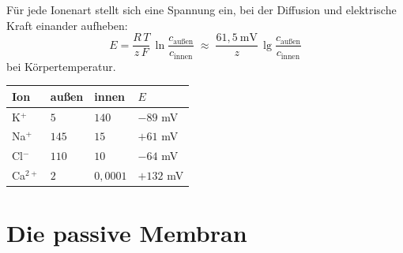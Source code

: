 \begin{merksatz}
Für jede Ionenart stellt sich eine Spannung ein, bei der Diffusion und elektrische Kraft einander aufheben:
\[ E = \frac{R\,T}{z\,F}\,\ln\frac{c_{\text{außen}}}{c_{\text{innen}}} \;\approx\; \frac{61{,}5\ \mathrm{mV}}{z}\,\lg\frac{c_{\text{außen}}}{c_{\text{innen}}} \]
bei Körpertemperatur.

\begin{center}
{\small
\renewcommand{\arraystretch}{1.45}
\begin{tabular}{@{}P{1.6cm}P{1.8cm}P{1.8cm}P{2.0cm}@{}}
\toprule
\textbf{Ion} & \textbf{außen} & \textbf{innen} & $E$\\
\midrule
K$^+$ & $5$ & $140$ & $-89$ mV\\
Na$^+$ & $145$ & $15$ & $+61$ mV\\
Cl$^-$ & $110$ & $10$ & $-64$ mV\\
Ca$^{2+}$ & $2$ & $0{,}0001$ & $+132$ mV\\
\bottomrule
\end{tabular}}
\end{center}

\begin{center}
\begin{minipage}{0.88\textwidth}
\end{minipage}
\end{center}
\end{merksatz}

\section{Die passive Membran}

